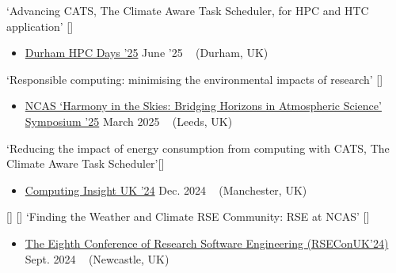 \begin{talks}

    \talk
	{\faCommentingO \hspace{0.2mm} `Advancing CATS, The Climate Aware Task Scheduler, for HPC and HTC application' [\href{https://github.com/sadielbartholomew/sadielbartholomew/blob/master/talks-and-workshops/CATS_Durham_HPC_Days.pdf}{\small{\linkSymbol}}]}
	{
	\begin{itemize}[leftmargin=.4in]
	    \item \href{https://www.durham.ac.uk/research/institutes-and-centres/data-science/events-/durham---hpc-days/}{Durham HPC Days '25}
	    \hfill June '25 ~ (Durham, UK)
	\end{itemize}
	}

    \talk
	{\faCommentingO \hspace{0.2mm} `Responsible computing: minimising the environmental impacts of research' [\href{https://github.com/sadielbartholomew/sadielbartholomew/blob/master/talks-and-workshops/ncas-ec-symposium-greencomputing.pdf}{\small{\linkSymbol}}]}
	{
	\begin{itemize}[leftmargin=.4in]
	    \item \href{https://sites.google.com/ncas.ac.uk/harmony-in-the-skies-2025/home}{NCAS `Harmony in the Skies: Bridging Horizons in Atmospheric Science' Symposium '25}
	    \hfill March 2025 ~ (Leeds, UK)
	\end{itemize}
	}

    \talk
	{\faCommentingO \hspace{0.2mm} `Reducing the impact of energy consumption from computing with CATS, The Climate Aware Task Scheduler'[\href{https://github.com/sadielbartholomew/sadielbartholomew/blob/master/talks-and-workshops/ciuk24-reducing-carbon-impact-cats.pdf}{\small{\linkSymbol}}]}
	{
	\begin{itemize}[leftmargin=.4in]
	    \item \href{https://web.cvent.com/event/009945f6-7796-4bc8-aa43-8d7a64287c7b/websitePage:caaebd05-0233-4466-9ebf-d7dbd1edfdd4}{Computing Insight UK '24}
	    \hfill Dec. 2024 ~ (Manchester, UK)
	\end{itemize}
	}

    \talk
	{\faCommentingO \hspace{1mm} [\faUserPlus] \hspace{1mm} [\faEnvelopeO] \hspace{1mm} `Finding the Weather and Climate RSE Community: RSE at NCAS' [\href{https://docs.google.com/presentation/d/1EroCJEARScMQy9Sjqnuubzx4VeOEazJ9U4f8JuYnByo/edit#slide=id.p}{\small{\linkSymbol}}]}
	{
	\begin{itemize}[leftmargin=.4in]
	    \item \href{https://rsecon24.society-rse.org/}{The Eighth Conference of Research Software Engineering (RSEConUK'24)}
	    \hfill Sept. 2024 ~ (Newcastle, UK)
	\end{itemize}
	}


\end{talks}
